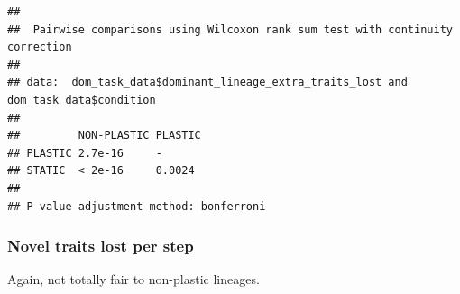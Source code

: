 \documentclass[]{book}
\newenvironment{Shaded}{\begin{snugshade}}{\end{snugshade}}
\newcommand{\DataTypeTok}[1]{\textcolor[rgb]{0.13,0.29,0.53}{#1}}
\newcommand{\FloatTok}[1]{\textcolor[rgb]{0.00,0.00,0.81}{#1}}
\newcommand{\KeywordTok}[1]{\textcolor[rgb]{0.13,0.29,0.53}{\textbf{#1}}}
\newcommand{\NormalTok}[1]{#1}
\newcommand{\OperatorTok}[1]{\textcolor[rgb]{0.81,0.36,0.00}{\textbf{#1}}}
\newcommand{\OtherTok}[1]{\textcolor[rgb]{0.56,0.35,0.01}{#1}}
\newcommand{\StringTok}[1]{\textcolor[rgb]{0.31,0.60,0.02}{#1}}
\begin{document}
\begin{Shaded}
\end{Shaded}

\begin{verbatim}
## 
##  Pairwise comparisons using Wilcoxon rank sum test with continuity correction 
## 
## data:  dom_task_data$dominant_lineage_extra_traits_lost and dom_task_data$condition 
## 
##         NON-PLASTIC PLASTIC
## PLASTIC 2.7e-16     -      
## STATIC  < 2e-16     0.0024 
## 
## P value adjustment method: bonferroni
\end{verbatim}

\hypertarget{novel-traits-lost-per-step}{%
\subsubsection{Novel traits lost per step}\label{novel-traits-lost-per-step}}

Again, not totally fair to non-plastic lineages.
\end{document}
